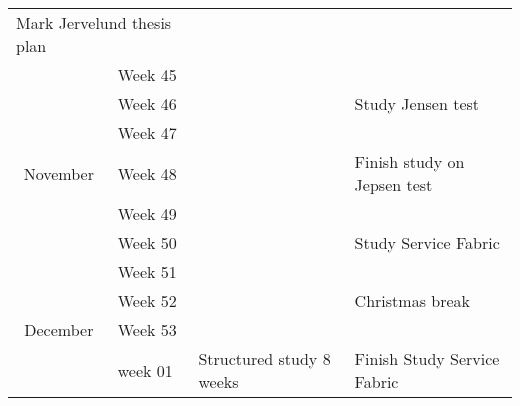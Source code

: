 \documentclass[a4paper,10pt,titlepage]{report}
\begin{document}
\begin{tabular}{clll}
\multicolumn{2}{l}{Mark Jervelund thesis plan} &                                           &                  \\
                                & Week 45      &                                             &                                                                                                                            \\
                                & Week 46      &                                             & \multirow{-2}{*}{Study Jensen test}                                                                                        \\
                                & Week 47      &                                             &                                                                                                                            \\
\multirow{-4}{*}{November}      & Week 48      &                                             & \multirow{-2}{*}{Finish study on Jepsen test}                                                                              \\
                                & Week 49      &                                             &                                                                                                                            \\
                                & Week 50      &                                             & \multirow{-2}{*}{Study Service Fabric}                                                                                     \\
                                & Week 51      &                                             &                                                                            \\
                                & Week 52      &                                             & \multirow{-2}{*}{ Christmas break}                                            \\
\multirow{-5}{*}{December}      & Week 53      &                                             &                                                                                                                            \\
                                & week 01      &  \multirow{-10}{*}{Structured study 8 weeks} & \multirow{-2}{*}{Finish Study Service Fabric}                                                                              \\

\end{tabular}
\end{document}
